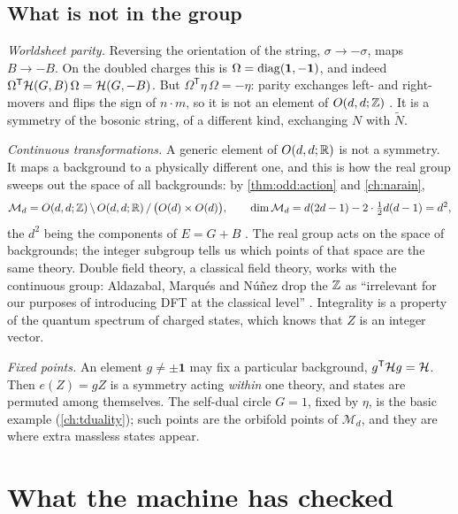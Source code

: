 \subsection{What is not in the group}

\emph{Worldsheet parity.} Reversing the orientation of the string,
$\sigma\to-\sigma$, maps $B\to-B$. On the doubled charges this is
$\Omega=\operatorname{diag}(\mathbf 1,-\mathbf 1)$, and indeed
$\Omega^{\mathsf T}\mathcal{H}(G,B)\,\Omega=\mathcal{H}(G,-B)$. But
$\Omega^{\mathsf T}\eta\,\Omega=-\eta$: parity exchanges left- and right-movers and flips
the sign of $n\cdot m$, so it is not an element of $O(d,d;\mathbb{Z})$ . It is a symmetry of the bosonic string, of a different kind, exchanging
$N$ with $\tilde N$.

\emph{Continuous transformations.} A generic element of $O(d,d;\mathbb{R})$ is not a symmetry. It
maps a background to a physically different one, and this is how the real group sweeps out
the space of all backgrounds: by \cref{thm:odd:action} and \cref{ch:narain},
\begin{equation}\label{eq:odd:moduli}
 \mathcal M_d=O(d,d;\mathbb{Z})\,\backslash\,O(d,d;\mathbb{R})\,/\,\big(O(d)\times O(d)\big),\qquad
 \dim\mathcal M_d=d(2d-1)-2\cdot\tfrac12d(d-1)=d^2 ,
\end{equation}
the $d^2$ being the components of $E=G+B$ . The real
group acts on the space of backgrounds; the integer subgroup tells us which points of that
space are the same theory. Double field theory, a classical field theory, works with the
continuous group: Aldazabal, Marqu\'es and N\'u\~nez drop the $\mathbb{Z}$ as ``irrelevant for our
purposes of introducing DFT at the classical level'' .
Integrality is a property of the quantum spectrum of charged states, which knows that $Z$
is an integer vector.

\emph{Fixed points.} An element $g\neq\pm\mathbf 1$ may fix a particular background,
$g^{\mathsf T}\mathcal{H} g=\mathcal{H}$. Then $e(Z)=gZ$ is a symmetry acting \emph{within} one theory, and
states are permuted among themselves. The self-dual circle $G=1$, fixed by $\eta$, is the
basic example (\cref{ch:tduality}); such points are the orbifold points of $\mathcal M_d$,
and they are where extra massless states appear.

\section{What the machine has checked}\label{sec:odd:lean}

